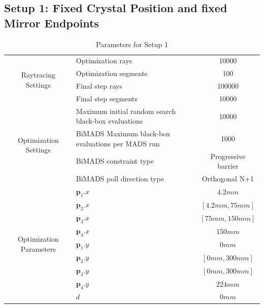 \documentclass[a4paper,10pt]{article}
\renewcommand{\vec}[1]{\mathbf{#1}}
\begin{document}
    \subsection{Setup 1: Fixed Crystal Position and fixed Mirror Endpoints}
    
    
    \begin{table}
    \centering
    \setlength\tabcolsep{8pt}
    \renewcommand{\arraystretch}{1.5}
    \begin{tabular}{| c | p{40mm} | c |}
        \hline
        \multirow{4}{*}{Raytracing Settings} & Optimization rays & 10000 \\
        \cline{2-3}
        & Optimization segments & 100 \\
        \cline{2-3}
        & Final step rays & 100000 \\
        \cline{2-3}
        & Final step segments & 10000 \\
        \hline
        \multirow{4}{*}{Optimization Settings} & Maximum initial random search black-box evaluations & 10000 \\
        \cline{2-3}
        & BiMADS Maximum black-box evaluations per MADS run & 1000 \\
        \cline{2-3}
        & BiMADS constraint type & Progressive barrier \\
        \cline{2-3}
        & BiMADS poll direction type & Orthogonal N+1 \\
        \hline
        \multirow{9}{*}{Optimization Parameters} & 
        $\vec{p}_1.x$ & $4.2mm$ \\
        \cline{2-3}
        & $\vec{p}_2.x$ & $[4.2mm, 75mm]$\\
        \cline{2-3}
        & $\vec{p}_3.x$ & $[75mm, 150mm]$\\ 
        \cline{2-3}
        & $\vec{p}_4.x$ & $150mm$\\ 
        \cline{2-3}
        & $\vec{p}_1.y$ & $0mm$ \\
        \cline{2-3}
        & $\vec{p}_2.y$ & $[0mm, 300mm]$\\
        \cline{2-3}
        & $\vec{p}_3.y$ & $[0mm, 300mm]$\\ 
        \cline{2-3}
        & $\vec{p}_4.y$ & $224mm$\\ 
        \cline{2-3}
        & $d$ & $0mm$\\ 
        \hline 
    \end{tabular}
    \caption{Parameters for Setup 1}
    \end{table}
\end{document}

